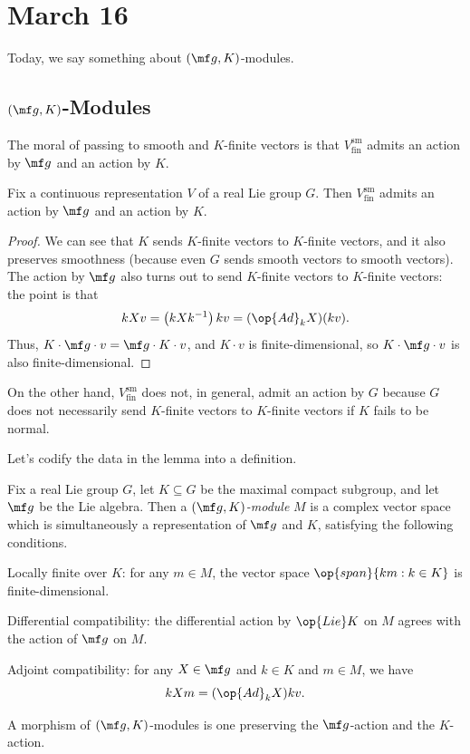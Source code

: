 \documentclass[../notes.tex]{subfiles}
\begin{document}
\section{March 16}
Today, we say something about $(\mf g,K)$-modules.

\subsection{\texorpdfstring{$(\mf g,K)$}{(g, K)}-Modules}
The moral of passing to smooth and $K$-finite vectors is that $V^{\mathrm{sm}}_{\mathrm{fin}}$ admits an action by $\mf g$ and an action by $K$.
\begin{lemma} \label{lem:get-gk-mod}
	Fix a continuous representation $V$ of a real Lie group $G$. Then $V^{\mathrm{sm}}_{\mathrm{fin}}$ admits an action by $\mf g$ and an action by $K$.
\end{lemma}
\begin{proof}
	We can see that $K$ sends $K$-finite vectors to $K$-finite vectors, and it also preserves smoothness (because even $G$ sends smooth vectors to smooth vectors). The action by $\mf g$ also turns out to send $K$-finite vectors to $K$-finite vectors: the point is that
	\[kXv=\left(kXk^{-1}\right)kv=(\op{Ad}_kX)(kv).\]
	Thus, $K\cdot\mf g\cdot v=\mf g\cdot K\cdot v$, and $K\cdot v$ is finite-dimensional, so $K\cdot\mf g\cdot v$ is also finite-dimensional.
\end{proof}
\begin{remark}
	On the other hand, $V^{\mathrm{sm}}_{\mathrm{fin}}$ does not, in general, admit an action by $G$ because $G$ does not necessarily send $K$-finite vectors to $K$-finite vectors if $K$ fails to be normal.
\end{remark}
Let's codify the data in the lemma into a definition.
\begin{defihelper}[$(\mf g,K)$-module] 
	Fix a real Lie group $G$, let $K\subseteq G$ be the maximal compact subgroup, and let $\mf g$ be the Lie algebra. Then a \textit{$(\mf g,K)$-module} $M$ is a complex vector space which is simultaneously a representation of $\mf g$ and $K$, satisfying the following conditions.
	\begin{listroman}
		\item Locally finite over $K$: for any $m\in M$, the vector space $\op{span}\{km:k\in K\}$ is finite-dimensional.
		\item Differential compatibility: the differential action by $\op{Lie}K$ on $M$ agrees with the action of $\mf g$ on $M$.
		\item Adjoint compatibility: for any $X\in\mf g$ and $k\in K$ and $m\in M$, we have
		\[kXm=(\op{Ad}_kX)kv.\]
	\end{listroman}
	A morphism of $(\mf g,K)$-modules is one preserving the $\mf g$-action and the $K$-action.
\end{defihelper}
\end{document}
